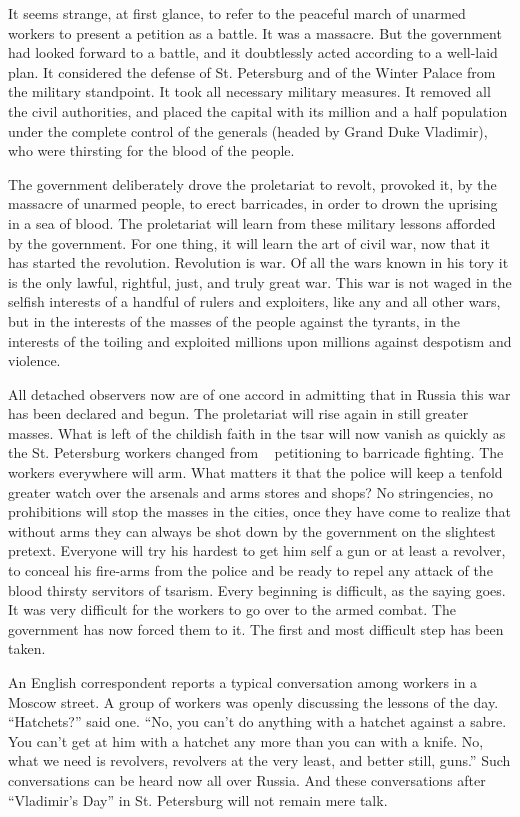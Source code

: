 \documentclass[
]{article}
\begin{document}
It seems strange, at first glance, to refer to the peaceful march of
unarmed workers to present a petition as a battle. It was a massacre.
But the government had looked forward to a battle, and it doubtlessly
acted according to a well-laid plan. It considered the defense of St.
Petersburg and of the Winter Palace from the military standpoint. It
took all necessary military measures. It removed all the civil
authorities, and placed the capital with its million and a half
population under the complete control of the generals (headed by Grand
Duke Vladimir), who were thirsting for the blood of the people.

The government deliberately drove the proletariat to revolt, provoked
it, by the massacre of unarmed people, to erect barricades, in order to
drown the uprising in a sea of blood. The proletariat will learn from
these military lessons afforded by the government. For one thing, it
will learn the art of civil war, now that it has started the revolution.
Revolution is war. Of all the wars known in his tory it is the only
lawful, rightful, just, and truly great war. This war is not waged in
the selfish interests of a handful of rulers and exploiters, like any
and all other wars, but in the interests of the masses of the people
against the tyrants, in the interests of the toiling and exploited
millions upon millions against despotism and violence.

All detached observers now are of one accord in admitting that in Russia
this war has been declared and begun. The proletariat will rise again in
still greater masses. What is left of the childish faith in the tsar
will now vanish as quickly as the St. Petersburg workers changed from ~
petitioning to barricade fighting. The workers everywhere will arm. What
matters it that the police will keep a tenfold greater watch over the
arsenals and arms stores and shops? No stringencies, no prohibitions
will stop the masses in the cities, once they have come to realize that
without arms they can always be shot down by the government on the
slightest pretext. Everyone will try his hardest to get him self a gun
or at least a revolver, to conceal his fire-arms from the police and be
ready to repel any attack of the blood thirsty servitors of tsarism.
Every beginning is difficult, as the saying goes. It was very difficult
for the workers to go over to the armed combat. The government has now
forced them to it. The first and most difficult step has been taken.

An English correspondent reports a typical conversation among workers in
a Moscow street. A group of workers was openly discussing the lessons of
the day. ``Hatchets?'' said one. ``No, you can't do anything with a
hatchet against a sabre. You can't get at him with a hatchet any more
than you can with a knife. No, what we need is revolvers, revolvers at
the very least, and better still, guns.'' Such conversations can be
heard now all over Russia. And these conversations after ``Vladimir's
Day'' in St. Petersburg will not remain mere talk.
\end{document}
